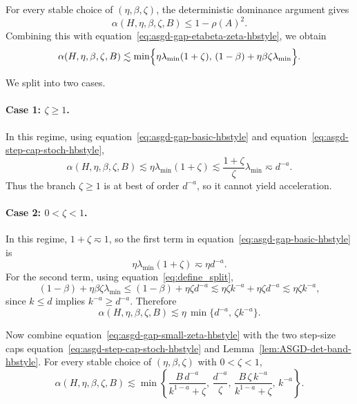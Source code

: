\documentclass{article}
\def\eqref#1{equation~\ref{#1}}
\begin{document}
For every stable choice of \((\eta,\beta,\zeta)\), the deterministic dominance
argument gives
\[
\alpha(H,\eta,\beta,\zeta,B)
\le
1-\rho(A)^2.
\]
Combining this with \eqref{eq:asgd-gap-etabeta-zeta-hbstyle}, we obtain
\begin{equation}
\label{eq:asgd-gap-basic-hbstyle}
\alpha(H,\eta,\beta,\zeta,B)
\lesssim
\min\Bigl\{
\eta\lambda_{\min}(1+\zeta),
\,
(1-\beta)+\eta\beta\zeta\lambda_{\min}
\Bigr\}.
\end{equation}

We split into two cases.

\paragraph{Case 1: \(\zeta\ge 1\).}
In this regime, using \eqref{eq:asgd-gap-basic-hbstyle} and
\eqref{eq:asgd-step-cap-stoch-hbstyle},
\[
\alpha(H,\eta,\beta,\zeta,B)
\lesssim
\eta\lambda_{\min}(1+\zeta)
\lesssim
\frac{1+\zeta}{\zeta}\lambda_{\min}
\eqsim
d^{-a}.
\]
Thus the branch \(\zeta\ge 1\) is at best of order \(d^{-a}\), so it cannot
yield acceleration.

\paragraph{Case 2: \(0<\zeta<1\).}
In this regime, \(1+\zeta\eqsim 1\), so the first term in
\eqref{eq:asgd-gap-basic-hbstyle} is
\[
\eta\lambda_{\min}(1+\zeta)\eqsim \eta d^{-a}.
\]
For the second term, using \eqref{eq:define_split},
\[
(1-\beta)+\eta\beta\zeta\lambda_{\min}
\le
(1-\beta)+\eta\zeta d^{-a}
\lesssim
\eta\zeta k^{-a}+\eta\zeta d^{-a}
\lesssim
\eta\zeta k^{-a},
\]
since \(k\le d\) implies \(k^{-a}\ge d^{-a}\). Therefore
\begin{equation}
\label{eq:asgd-gap-small-zeta-hbstyle}
\alpha(H,\eta,\beta,\zeta,B)
\lesssim
\eta\,\min\{d^{-a},\,\zeta k^{-a}\}.
\end{equation}

Now combine \eqref{eq:asgd-gap-small-zeta-hbstyle} with the two step-size caps
\eqref{eq:asgd-step-cap-stoch-hbstyle} and
Lemma~\ref{lem:ASGD-det-band-hbstyle}. For every stable choice of
\((\eta,\beta,\zeta)\) with \(0<\zeta<1\),
\begin{equation}
\label{eq:asgd-four-term-bound-hbstyle}
\alpha(H,\eta,\beta,\zeta,B)
\lesssim
\min\left\{
\frac{B\,d^{-a}}{k^{1-a}+\zeta},
\,
\frac{d^{-a}}{\zeta},
\,
\frac{B\,\zeta\,k^{-a}}{k^{1-a}+\zeta},
\,
k^{-a}
\right\}.
\end{equation}
\end{document}
